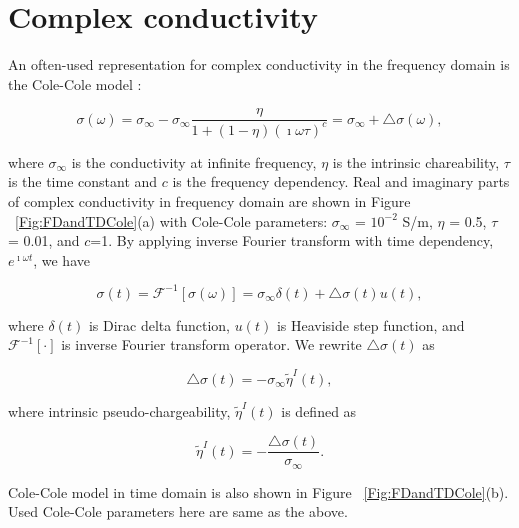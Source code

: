 \documentclass[extra,mreferee]{gji}
\newcommand{\siginf}{\sigma_\infty}
\newcommand{\dsig}{\triangle\sigma}
\newcommand{\peta}{\tilde{\eta}}
\begin{document}
\section{Complex conductivity}
An often-used representation for complex conductivity in the frequency domain is the Cole-Cole model \cite{COLE}:
\begin{linenomath*}
\begin{equation}
  \sigma(\omega) = \sigma_{\infty} - \sigma_{\infty}\frac{\eta}{1+(1-\eta)(\imath\omega\tau)^c} = \sigma_{\infty} + \triangle\sigma(\omega),
  \label{eq: sigma_freq}
\end{equation}
\end{linenomath*}
where $\sigma_{\infty}$ is the conductivity at infinite frequency, $\eta$ is the intrinsic chareability, $\tau$ is the time constant and $c$ is the frequency dependency. Real and imaginary parts of complex conductivity in frequency domain are shown in Figure ~\ref{Fig:FDandTDCole}(a) with Cole-Cole parameters: $\siginf$ = $10^{-2}$ S/m, $\eta $ = 0.5, $\tau$ = 0.01, and $c$=1. By applying inverse Fourier transform with time dependency, $e^{\imath\omega t}$, we have
\begin{linenomath*}
\begin{equation}
  \sigma(t) = \mathscr{F}^{-1}[\sigma(\omega)] = \sigma_{\infty}\delta(t) + \triangle\sigma(t)u(t),
  \label{eq: sigma_time}
\end{equation}
\end{linenomath*}
where $\delta(t)$ is Dirac delta function, $u(t)$ is Heaviside step function, and $\mathscr{F}^{-1}[\cdot]$ is inverse Fourier transform operator. 
We rewrite $\dsig(t)$ as 
\begin{linenomath*}
\begin{equation}
  \dsig(t) = - \siginf\peta^{I}(t),
  \label{eq: sigma_time_c1}
\end{equation}
\end{linenomath*}
where intrinsic pseudo-chargeability, $\peta^{I}(t)$ is defined as
\begin{linenomath*}
\begin{equation}
    \peta^{I}(t) = -\frac{\dsig(t)}{\siginf}. %
    \label{eq: intrinsic_peta}
\end{equation}
\end{linenomath*}
Cole-Cole model in time domain is also shown in Figure ~\ref{Fig:FDandTDCole}(b). Used Cole-Cole parameters here are same as the above.
\end{document}
